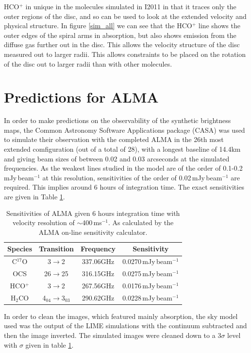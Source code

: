 \documentclass[useAMS,usenatbib]{mn2e}
\begin{document}
HCO$^+$ in unique in the molecules simulated in I2011 in that it traces only the outer regions of the disc, and so can be used to look at the extended velocity and physical structure. In figure \ref{sim_all} we can see that the HCO$^+$ line shows the outer edges of the spiral arms in absorption, but also shows emission from the diffuse gas further out in the disc. This allows the velocity structure of the disc measured out to larger radii. This allows constraints to be placed on the rotation of the disc out to larger radii than with other molecules. 


\section{Predictions for ALMA} \label{sec:alma_predictions}

In order to make predictions on the observability of the synthetic brightness maps, the Common Astronomy Software Applications package (CASA) was used to simulate their observation with the completed ALMA in the 26th most extended comfiguration (out of a total of 28), with a longest baseline of 14.4km and giving beam sizes of between 0.02 and 0.03 arcseconds at the simulated frequencies. As the weakest lines studied in the model are of the order of 0.1-0.2$\,$mJy$\,$beam$^{-1}$ at this resolution, sensitivities of the order of 0.02$\,$mJy$\,$beam$^{-1}$ are required. This implies around 6 hours of integration time. The exact sensitivities are given in Table \ref{sigmas}.
\begin{table}
 \centering
 \begin{minipage}{80mm}
   \caption{Sensitivities of ALMA given 6 hours integration time with velocity resolution of $\sim$400$\,$ms$^{-1}$. As calculated by the ALMA on-line sensitivity calculator.}
   \label{sigmas}
   \begin{tabular}{c||c|c|c}
     \hline
     Species & Transition & Frequency & Sensitivity\\
     \hline
     C$^{17}$O & 3$\rightarrow$2 & 337.06GHz & 0.0270$\,$mJy$\,$beam$^{-1}$ \\
     OCS & 26$\rightarrow$25 & 316.15GHz & 0.0275$\,$mJy$\,$beam$^{-1}$ \\
     HCO$^+$ & 3$\rightarrow$2 & 267.56GHz & 0.0176$\,$mJy$\,$beam$^{-1}$ \\
     H$_2$CO & 4$_{04}\rightarrow$3$_{03}$ & 290.62GHz & 0.0228$\,$mJy$\,$beam$^{-1}$ \\
     \hline
   \end{tabular}
 \end{minipage}
\end{table}
In order to clean the images, which featured mainly absorption, the sky model used was the output of the LIME simulations with the continuum subtracted and then the image inverted. The simulated images were cleaned down to a 3$\sigma$ level with $\sigma$ given in table \ref{sigmas}.\newline
\end{document}
